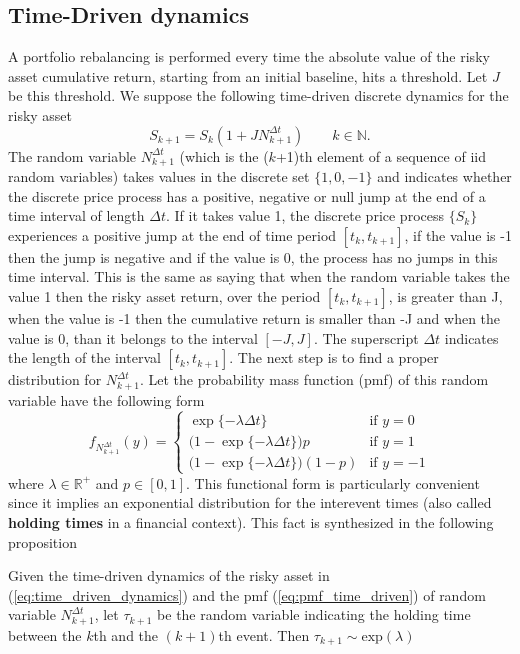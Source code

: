 \subsection{Time-Driven dynamics}
A portfolio rebalancing is performed every time the absolute value of the risky asset cumulative return, starting from an initial baseline, hits a threshold. Let $J$ be this threshold. We suppose the following time-driven discrete dynamics for the risky asset
\begin{equation}\label{eq:time_driven_dynamics}
S_{k+1} = S_k(1 + J N^{\Delta t}_{k+1}) \qquad k \in \mathbb{N}.
\end{equation}
The random variable $N^{\Delta t}_{k+1}$ (which is the ($k$+1)th element of a sequence of iid random variables) takes values in the discrete set $\{1,0,-1\}$ and indicates whether the discrete price process has a positive, negative or null jump at the end of a time interval of length $\Delta t$. If it takes value 1, the discrete price process $\{S_k\}$ experiences a positive jump at the end of time period $[t_k,t_{k+1}]$, if the value is -1 then the jump is negative and if the value is 0, the process has no jumps in this time interval. This is the same as saying that when the random variable takes the value 1 then the risky asset return, over the period $[t_k,t_{k+1}]$, is greater than J, when the value is -1 then the cumulative return is smaller than -J and when the value is 0, than it belongs to the interval $[-J,J]$. The superscript $\Delta t$ indicates the length of the interval $[t_k,t_{k+1}]$. The next step is to find a proper distribution for $N^{\Delta t}_{k+1}$.
Let the probability mass function (pmf) of this random variable  have the following form
\begin{equation}\label{eq:pmf_time_driven}
f_{N^{\Delta t}_{k+1}}(y) = 
\begin{cases}
 \exp\{-\lambda \Delta t\} & \text{if } y = 0 \\
 \big(1-\exp\{-\lambda \Delta t\}\big)p & \text{if } y = 1 \\
 \big(1-\exp\{-\lambda \Delta t\}\big)(1-p) & \text{if } y = -1
\end{cases}
\end{equation}
where $\lambda \in \mathbb{R}^{+}$ and $p \in [0,1]$. This functional form is particularly convenient since it implies an exponential distribution for the interevent times (also called \textbf{holding times} in a financial context). This fact is synthesized in the following proposition
\begin{proposition}\label{prop:tau_distribution}
	Given the time-driven dynamics of the risky asset in (\ref{eq:time_driven_dynamics}) and the pmf (\ref{eq:pmf_time_driven}) of random variable $N^{\Delta t}_{k+1}$, let $\tau_{k+1}$ be the random variable indicating the holding time between the $k$th and the $(k+1)$th event.
	Then $\tau_{k+1} \sim \text{exp}(\lambda)$
\end{proposition}
